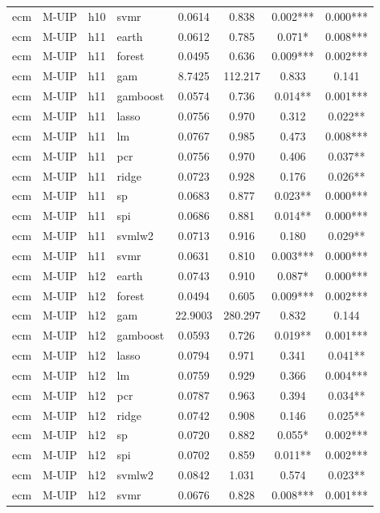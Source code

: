 \begin{ThreePartTable}
\begin{longtable}[t]{llclcccc}
ecm & M-UIP & h10 & svmr & 0.0614 & 0.838 & 0.002*** & 0.000***\\
\addlinespace
ecm & M-UIP & h11 & earth & 0.0612 & 0.785 & 0.071* & 0.008***\\
ecm & M-UIP & h11 & forest & 0.0495 & 0.636 & 0.009*** & 0.002***\\
ecm & M-UIP & h11 & gam & 8.7425 & 112.217 & 0.833 & 0.141\\
ecm & M-UIP & h11 & gamboost & 0.0574 & 0.736 & 0.014** & 0.001***\\
ecm & M-UIP & h11 & lasso & 0.0756 & 0.970 & 0.312 & 0.022**\\
ecm & M-UIP & h11 & lm & 0.0767 & 0.985 & 0.473 & 0.008***\\
ecm & M-UIP & h11 & pcr & 0.0756 & 0.970 & 0.406 & 0.037**\\
ecm & M-UIP & h11 & ridge & 0.0723 & 0.928 & 0.176 & 0.026**\\
ecm & M-UIP & h11 & sp & 0.0683 & 0.877 & 0.023** & 0.000***\\
ecm & M-UIP & h11 & spi & 0.0686 & 0.881 & 0.014** & 0.000***\\
ecm & M-UIP & h11 & svmlw2 & 0.0713 & 0.916 & 0.180 & 0.029**\\
ecm & M-UIP & h11 & svmr & 0.0631 & 0.810 & 0.003*** & 0.000***\\
\addlinespace
ecm & M-UIP & h12 & earth & 0.0743 & 0.910 & 0.087* & 0.000***\\
ecm & M-UIP & h12 & forest & 0.0494 & 0.605 & 0.009*** & 0.002***\\
ecm & M-UIP & h12 & gam & 22.9003 & 280.297 & 0.832 & 0.144\\
ecm & M-UIP & h12 & gamboost & 0.0593 & 0.726 & 0.019** & 0.001***\\
ecm & M-UIP & h12 & lasso & 0.0794 & 0.971 & 0.341 & 0.041**\\
ecm & M-UIP & h12 & lm & 0.0759 & 0.929 & 0.366 & 0.004***\\
ecm & M-UIP & h12 & pcr & 0.0787 & 0.963 & 0.394 & 0.034**\\
ecm & M-UIP & h12 & ridge & 0.0742 & 0.908 & 0.146 & 0.025**\\
ecm & M-UIP & h12 & sp & 0.0720 & 0.882 & 0.055* & 0.002***\\
ecm & M-UIP & h12 & spi & 0.0702 & 0.859 & 0.011** & 0.002***\\
ecm & M-UIP & h12 & svmlw2 & 0.0842 & 1.031 & 0.574 & 0.023**\\
ecm & M-UIP & h12 & svmr & 0.0676 & 0.828 & 0.008*** & 0.001***\\

\end{longtable}
\end{ThreePartTable}
